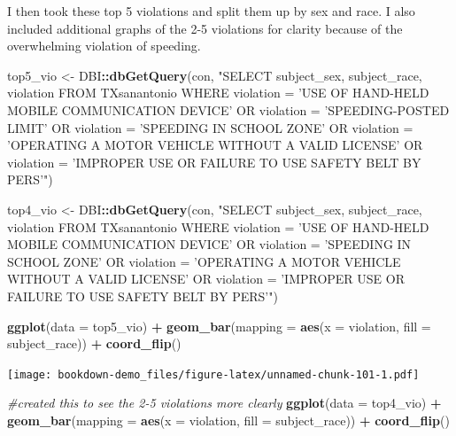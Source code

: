 \documentclass[
]{book}
\newenvironment{Shaded}{\begin{snugshade}}{\end{snugshade}}
\newcommand{\CommentTok}[1]{\textcolor[rgb]{0.56,0.35,0.01}{\textit{#1}}}
\newcommand{\DataTypeTok}[1]{\textcolor[rgb]{0.13,0.29,0.53}{#1}}
\newcommand{\KeywordTok}[1]{\textcolor[rgb]{0.13,0.29,0.53}{\textbf{#1}}}
\newcommand{\NormalTok}[1]{#1}
\newcommand{\OperatorTok}[1]{\textcolor[rgb]{0.81,0.36,0.00}{\textbf{#1}}}
\newcommand{\StringTok}[1]{\textcolor[rgb]{0.31,0.60,0.02}{#1}}
\begin{document}
I then took these top 5 violations and split them up by sex and race. I also included additional graphs of the 2-5 violations for clarity because of the overwhelming violation of speeding.

\begin{Shaded}
\begin{Highlighting}[]
\NormalTok{top5_vio <-}\StringTok{ }\NormalTok{DBI}\OperatorTok{::}\KeywordTok{dbGetQuery}\NormalTok{(con,}
  \StringTok{"SELECT subject_sex, subject_race, violation FROM TXsanantonio }
\StringTok{  WHERE violation = 'USE OF HAND-HELD MOBILE COMMUNICATION DEVICE' }
\StringTok{  OR violation = 'SPEEDING-POSTED LIMIT' }
\StringTok{  OR violation = 'SPEEDING IN SCHOOL ZONE' }
\StringTok{  OR violation = 'OPERATING A MOTOR VEHICLE WITHOUT A VALID LICENSE' }
\StringTok{  OR violation = 'IMPROPER USE OR FAILURE TO USE SAFETY BELT BY PERS'"}\NormalTok{)}

\NormalTok{top4_vio <-}\StringTok{ }\NormalTok{DBI}\OperatorTok{::}\KeywordTok{dbGetQuery}\NormalTok{(con,}
  \StringTok{"SELECT subject_sex, subject_race, violation FROM TXsanantonio }
\StringTok{  WHERE violation = 'USE OF HAND-HELD MOBILE COMMUNICATION DEVICE' }
\StringTok{  OR violation = 'SPEEDING IN SCHOOL ZONE' }
\StringTok{  OR violation = 'OPERATING A MOTOR VEHICLE WITHOUT A VALID LICENSE' }
\StringTok{  OR violation = 'IMPROPER USE OR FAILURE TO USE SAFETY BELT BY PERS'"}\NormalTok{)}

\KeywordTok{ggplot}\NormalTok{(}\DataTypeTok{data =}\NormalTok{ top5_vio) }\OperatorTok{+}\StringTok{ }\KeywordTok{geom_bar}\NormalTok{(}\DataTypeTok{mapping =} \KeywordTok{aes}\NormalTok{(}\DataTypeTok{x =}\NormalTok{ violation, }\DataTypeTok{fill =}\NormalTok{ subject_race)) }\OperatorTok{+}\StringTok{ }
\StringTok{  }\KeywordTok{coord_flip}\NormalTok{()}
\end{Highlighting}
\end{Shaded}

\texttt{[image: bookdown-demo\_files/figure-latex/unnamed-chunk-101-1.pdf]}

\begin{Shaded}
\begin{Highlighting}[]
\CommentTok{#created this to see the 2-5 violations more clearly}
\KeywordTok{ggplot}\NormalTok{(}\DataTypeTok{data =}\NormalTok{ top4_vio) }\OperatorTok{+}\StringTok{ }\KeywordTok{geom_bar}\NormalTok{(}\DataTypeTok{mapping =} \KeywordTok{aes}\NormalTok{(}\DataTypeTok{x =}\NormalTok{ violation, }\DataTypeTok{fill =}\NormalTok{ subject_race)) }\OperatorTok{+}\StringTok{ }
\StringTok{  }\KeywordTok{coord_flip}\NormalTok{()}
\end{Highlighting}
\end{Shaded}
\end{document}

